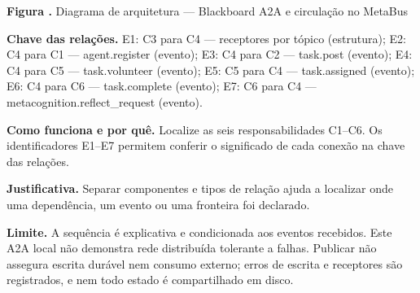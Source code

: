 {\small\textbf{Figura \thefigure.} Diagrama de arquitetura --- Blackboard A2A e circulação no MetaBus}\par\smallskip
{\footnotesize\textbf{Chave das relações.} E1: C3 para C4 --- receptores por tópico (estrutura); E2: C4 para C1 --- agent.register (evento); E3: C4 para C2 --- task.post (evento); E4: C4 para C5 --- task.volunteer (evento); E5: C5 para C4 --- task.assigned (evento); E6: C4 para C6 --- task.complete (evento); E7: C6 para C4 --- metacognition.reflect\_request (evento).}\par\smallskip
\noindent\textbf{Como funciona e por quê.} Localize as seis responsabilidades C1--C6. Os identificadores E1--E7 permitem conferir o significado de cada conexão na chave das relações.\par
\noindent\textbf{Justificativa.} Separar componentes e tipos de relação ajuda a localizar onde uma dependência, um evento ou uma fronteira foi declarado.\par
\noindent\textbf{Limite.} A sequência é explicativa e condicionada aos eventos recebidos. Este A2A local não demonstra rede distribuída tolerante a falhas. Publicar não assegura escrita durável nem consumo externo; erros de escrita e receptores são registrados, e nem todo estado é compartilhado em disco.\par\smallskip
{}
